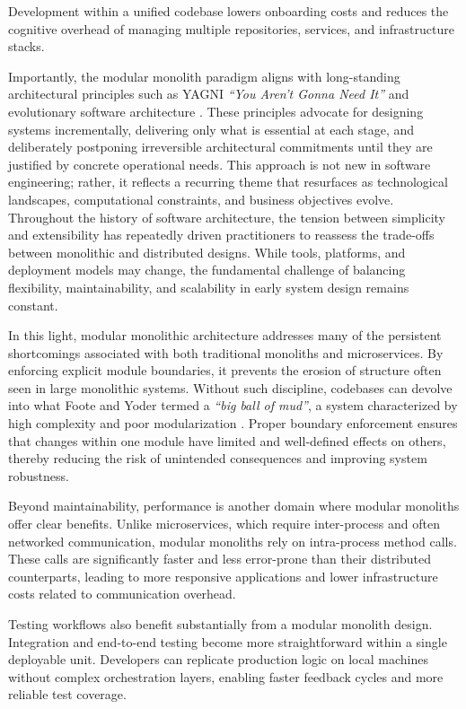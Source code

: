 Development within a unified codebase lowers onboarding costs and reduces the cognitive overhead of managing multiple repositories, services, and infrastructure stacks. 

Importantly, the modular monolith paradigm aligns with long-standing architectural principles such as YAGNI \textit{“You Aren’t Gonna Need It”} \cite{extremeProgramming} and evolutionary software architecture \cite{FordParsons2017}. These principles advocate for designing systems incrementally, delivering only what is essential at each stage, and deliberately postponing irreversible architectural commitments until they are justified by concrete operational needs. This approach is not new in software engineering; rather, it reflects a recurring theme that resurfaces as technological landscapes, computational constraints, and business objectives evolve. Throughout the history of software architecture, the tension between simplicity and extensibility has repeatedly driven practitioners to reassess the trade-offs between monolithic and distributed designs. While tools, platforms, and deployment models may change, the fundamental challenge of balancing flexibility, maintainability, and scalability in early system design remains constant.

In this light, modular monolithic architecture addresses many of the persistent shortcomings associated with both traditional monoliths and microservices. By enforcing explicit module boundaries, it prevents the erosion of structure often seen in large monolithic systems. Without such discipline, codebases can devolve into what Foote and Yoder termed a \textit{“big ball of mud”}, a system characterized by high complexity and poor modularization \cite{FooteYoder1999}. Proper boundary enforcement ensures that changes within one module have limited and well-defined effects on others, thereby reducing the risk of unintended consequences and improving system robustness.

Beyond maintainability, performance is another domain where modular monoliths offer clear benefits. Unlike microservices, which require inter-process and often networked communication, modular monoliths rely on intra-process method calls. These calls are significantly faster and less error-prone than their distributed counterparts, leading to more responsive applications and lower infrastructure costs related to communication overhead.

Testing workflows also benefit substantially from a modular monolith design. Integration and end-to-end testing become more straightforward within a single deployable unit. Developers can replicate production logic on local machines without complex orchestration layers, enabling faster feedback cycles and more reliable test coverage. 

